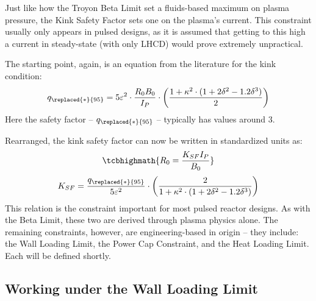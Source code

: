 Just like how the Troyon Beta Limit set a fluids-based maximum on plasma pressure, the Kink Safety Factor sets one on the plasma's current. This constraint usually only appears in pulsed designs, as it is assumed that getting to this high a current in steady-state (with only LHCD) would prove extremely unpractical.

The starting point, again, is an equation from the literature for the kink condition: \cite{process,oldpaper}
\begin{equation}
	q_{\replaced{*}{95}} = 5 \varepsilon^2 \cdot  \frac{ R_0 B_0 }{ I_P } \cdot \left( \frac{1 + \kappa^2 \cdot ( 1 + 2 \delta^2 - 1.2 \delta^3 ) }{2} \right)
\end{equation}
Here the safety factor -- $q_{\replaced{*}{95}}$ --  typically has values around 3. 

Rearranged, the kink safety factor can now be written in standardized units as:
\begin{equation}
	\label{eq:r_kink}
   \tcbhighmath{ R_0 = \frac{ K_{SF} I_P }{ B_0 } }
\end{equation}
\begin{equation}
  K_{SF} = \frac{q_{\replaced{*}{95}}}{5 \varepsilon^2} \cdot \left( \frac{2}{1 + \kappa^2 \cdot ( 1 + 2 \delta^2 - 1.2 \delta^3 ) } \right)
\end{equation}
This relation is the  constraint important for most pulsed reactor designs. As with the Beta Limit, these two are derived through plasma physics alone. The remaining  constraints, however, are engineering-based in origin -- they include: the Wall Loading Limit, the Power Cap Constraint, and the Heat Loading Limit. Each will be defined shortly.

\subsection{Working under the Wall Loading Limit}

